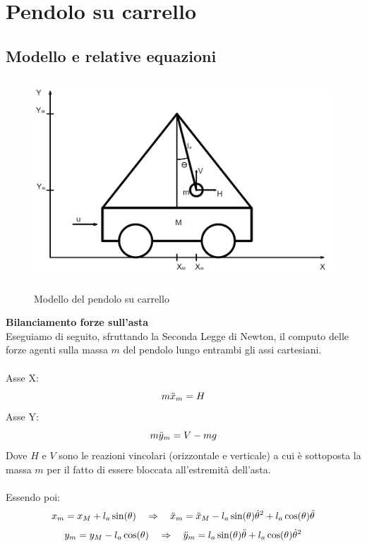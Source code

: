 \chapter{Pendolo su carrello}\label{PendCarrello}
\section{Modello e relative equazioni}\label{equazioni}
\begin{figure}[ht]
	\centering
	\includegraphics[height=75mm]{pendolo1.png}\\
	\caption{Modello del pendolo su carrello}
	\label{pendolo}
\end{figure}
\noindent\textbf{Bilanciamento forze sull'asta}\\
Eseguiamo di seguito, sfruttando la Seconda Legge di Newton, il computo delle forze agenti sulla massa $m$ del pendolo lungo entrambi gli assi cartesiani.\\\\
Asse X:
\begin{equation}\notag
m\ddot{x}_m=H
\end{equation}
Asse Y:
\begin{equation}\notag
m\ddot{y}_m=V-mg
\end{equation}
Dove $H$ e $V$ sono le reazioni vincolari (orizzontale e verticale) a cui è sottoposta la massa $m$ per il fatto di essere bloccata all'estremità dell'asta.\\\\
Essendo poi:\\
\begin{equation}\notag
x_m = x_M+l_a\sin(\theta) \quad \Rightarrow \quad \ddot{x}_m=\ddot{x}_M-l_a\sin(\theta)\dot{\theta}^2+l_a\cos(\theta)\ddot{\theta}
\end{equation}
\begin{equation}\notag
y_m=y_M-l_a\cos(\theta) \quad \Rightarrow \quad \ddot{y}_m=l_a\sin(\theta)\ddot{\theta}+l_a\cos(\theta)\dot{\theta}^2
\end{equation}
